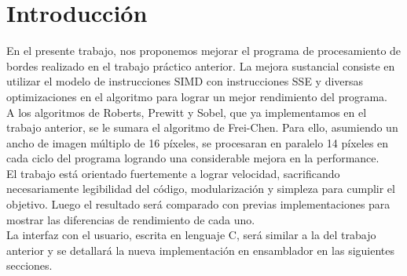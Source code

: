 \section{Introducci\'on}

	En el presente trabajo, nos proponemos mejorar el programa de procesamiento de bordes realizado en el trabajo pr\'actico anterior. La mejora sustancial consiste en utilizar el modelo de instrucciones SIMD con instrucciones SSE y diversas optimizaciones en el algoritmo para lograr un mejor rendimiento del programa. \\

	A los algoritmos de Roberts, Prewitt y Sobel, que ya implementamos en el trabajo anterior, se le sumara el algoritmo de Frei-Chen. Para ello, asumiendo un ancho de imagen m\'ultiplo de 16 p\'ixeles,  se procesaran en paralelo 14 p\'ixeles en cada ciclo del programa logrando una considerable mejora en la performance. \\

	
	El trabajo est\'a orientado fuertemente a lograr velocidad, sacrificando necesariamente legibilidad del c\'odigo, modularización y simpleza para cumplir el objetivo. Luego el resultado será comparado con previas implementaciones para mostrar las diferencias de rendimiento de cada uno. \\


	La interfaz con el usuario, escrita en lenguaje C, ser\'a similar a la del trabajo anterior y se detallará la nueva implementaci\'on en ensamblador en las siguientes secciones. \\

\pagebreak
